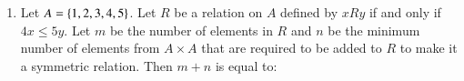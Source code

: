 \documentclass[journal,12pt,onecolumn]{IEEEtran}
\theoremstyle{remark}
\begin{document}
\begin{enumerate}
\begin{enumerate}
\end{enumerate}
\item Let $A = \left\{1, 2, 3, 4, 5\right\}$. Let $R$ be a relation on $A$ defined by $xRy$ if and only if $4x \leq 5y$. Let $m$ be the number of elements in $R$ and $n$ be the minimum number of elements from $A \times A$ that are required to be added to $R$ to make it a symmetric relation. Then $m + n$ is equal to:
\begin{enumerate}
\end{enumerate}
\end{enumerate}
\end{document}
